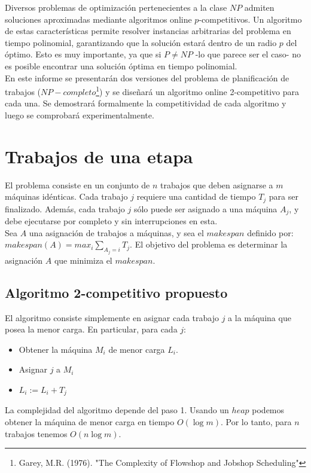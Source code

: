 \documentclass[12pt,letterpaper]{article}
\begin{document}
	Diversos problemas de optimización pertenecientes a la clase $NP$ admiten soluciones aproximadas mediante algoritmos online $p$-competitivos. Un algoritmo de estas características permite resolver instancias arbitrarias del problema en tiempo polinomial, garantizando que la solución estará dentro de un radio $p$ del óptimo. Esto es muy importante, ya que si $P \not= NP$ -lo que parece ser el caso- no es posible encontrar una solución óptima en tiempo polinomial. \\
	
	En este informe se presentarán dos versiones del problema de planificación de trabajos ($NP-completo$\footnote{Garey, M.R. (1976). "The Complexity of Flowshop and Jobshop Scheduling"}) y se diseñará un algoritmo online 2-competitivo para cada una. Se demostrará formalmente la competitividad de cada algoritmo y luego se comprobará experimentalmente.

\section{Trabajos de una etapa}
	El problema consiste en un conjunto de $n$ trabajos que deben asignarse a $m$ máquinas idénticas. Cada trabajo $j$ requiere una cantidad de tiempo $T_{j}$ para ser finalizado. Además, cada trabajo $j$ sólo puede ser asignado a una máquina $A_{j}$, y debe ejecutarse por completo y sin interrupciones en esta.\\
	
Sea $A$ una asignación de trabajos a máquinas, y sea el $makespan$ definido por: $makespan(A) = max_{i} \sum_{A_{j}=i} T_{j}$. El objetivo del problema es determinar la asignación $A$ que minimiza el $makespan$.

\subsection{Algoritmo 2-competitivo propuesto}
	El algoritmo consiste simplemente en asignar cada trabajo $j$ a la máquina que posea la menor carga. En particular, para cada $j$:
\begin{itemize}
\item[1.] Obtener la máquina $M_{i}$ de menor carga $L_{i}$.
\item[2.] Asignar $j$ a $M_{i}$
\item[3.] $L_{i} := L_{i} + T_{j}$
\end{itemize}

	La complejidad del algoritmo depende del paso 1. Usando un $heap$ podemos obtener la máquina de menor carga en tiempo $O(\log m)$. Por lo tanto, para $n$ trabajos tenemos $O(n \log m)$.
\end{document}
